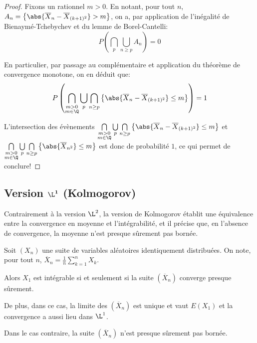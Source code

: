 \begin{proof}
\medskip
Fixons un rationnel $m>0$. En notant, pour tout $n$, $A_n = \left \{ \abs{\overline{X}_n - \overline{X}_{(k+1)^2}} > m \right \}$, on a, par application de l'inégalité de Bienaymé-Tchebychev et du lemme de Borel-Cantelli:
\[
P \left ( \bigcap \limits_{p} \bigcup \limits_{n \geq p} A_n \right ) = 0
\]

En particulier, par passage au complémentaire et application du théorème de convergence monotone, on en déduit que:
\[
P \left (\bigcap \limits_{\substack{m>0 \\ m \in \Q}}  \bigcup \limits_{p} \bigcap \limits_{n \geq p} \left \{ \abs{\overline{X}_n - \overline{X}_{(k+1)^2}} \leq m \right \} \right ) = 1
\]

L'intersection des évènements $\bigcap \limits_{\substack{m>0 \\ m \in \Q}}  \bigcup \limits_{p} \bigcap \limits_{n \geq p} \left \{ \abs{\overline{X}_n - \overline{X}_{(k+1)^2}} \leq m \right \}$ et $\bigcap \limits_{\substack{m>0 \\ m \in \Q}} \bigcup \limits_{p} \bigcap \limits_{n \geq p} \left \{ \abs{\overline{X}_{n^2}} \leq m \right \}$ est donc de probabilité $1$, ce qui permet de conclure!
\end{proof}

\subsection{Version $\mathbf{\L^1}$ (Kolmogorov)}

Contrairement à la version $\L^2$, la version de Kolmogorov établit une équivalence entre la convergence en moyenne et l'intégrabilité, et il précise que, en l'absence de convergence, la moyenne n'est presque sûrement pas bornée.

\begin{theo}
Soit $(X_n)$ une suite de variables aléatoires identiquement distribuées. On note, pour tout $n$, $\overline{X}_n = \frac{1}{n} \displaystyle{\sum_{k=1}^n} X_k$.

\medskip
Alors $X_1$ est intégrable si et seulement si la suite $\left (\overline{X}_n\right )$ converge presque sûrement.

\medskip
De plus, dans ce cas, la limite des $\left (\overline{X}_n\right )$ est unique et vaut $E(X_1)$ et la convergence a aussi lieu dans $\L^1$.

\medskip
Dans le cas contraire, la suite $\left (\overline{X}_n\right )$ n'est presque sûrement pas bornée.
\end{theo}


